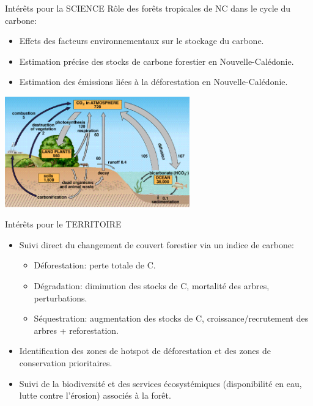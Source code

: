 \documentclass[10pt,table,dvipsnames,compress]{beamer}
\begin{document}
\begin{frame}[label={sec:orge912763}]{Intérêts pour la SCIENCE}
Rôle des forêts tropicales de NC dans le cycle du carbone:

\begin{itemize}
\item Effets des facteurs environnementaux sur le stockage du carbone.
\item Estimation précise des stocks de carbone forestier en Nouvelle-Calédonie.
\item Estimation des émissions liées à la déforestation en Nouvelle-Calédonie.
\end{itemize}

\begin{center}
\includegraphics[width=0.6\textwidth]{figs/carbon_cycle.png}
\end{center}
\end{frame}

\begin{frame}[label={sec:orgfa80b66}]{Intérêts pour le TERRITOIRE}
\begin{itemize}
\item Suivi direct du changement de couvert forestier via un indice de carbone:
\begin{itemize}
\item Déforestation: perte totale de C.
\item Dégradation: diminution des stocks de C, mortalité des arbres, perturbations.
\item Séquestration: augmentation des stocks de C, croissance/recrutement des arbres + reforestation.
\end{itemize}
\item Identification des zones de hotspot de déforestation et des zones de conservation prioritaires.
\item Suivi de la biodiversité et des services écosystémiques (disponibilité en eau, lutte contre l'érosion) associés à la forêt.
\end{itemize}
\end{frame}
\end{document}
